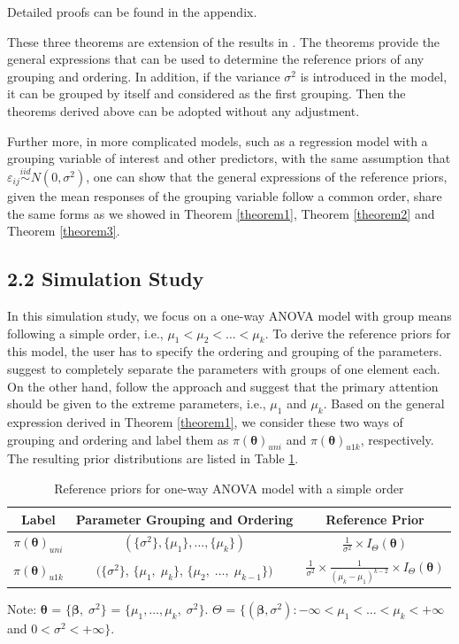 \documentclass[Proceedings]{ascelike}
\begin{document}
Detailed proofs can be found in the appendix. 

These three theorems are extension of the results in
\cite{Sonksen2012}. The theorems provide the general expressions that
can be used to determine the reference priors of any grouping and
ordering. In addition, if the variance $\sigma^2$ is introduced in the
model, it can be grouped by itself and considered as the first
grouping. Then the theorems derived above can be adopted without any
adjustment.


Further more, in more complicated models, such as a regression model
with a grouping variable of interest and other predictors, with the
same assumption that
$\varepsilon_{ij}\overset{iid}{\sim}N(0,\sigma^2)$, one can show that
the general expressions of the reference priors, given the mean
responses of the grouping variable follow a common order, share the
same forms as we showed in Theorem \eqref{theorem1}, Theorem
\eqref{theorem2} and Theorem \eqref{theorem3}.
\subsection{2.2 Simulation Study}
In this simulation study, we focus on a one-way ANOVA model with group
means following a simple order, i.e., $\mu_1<\mu_2<\hdots<\mu_k$. To
derive the reference priors for this model, the user has to specify
the ordering and grouping of the parameters. \cite{BergerBernardo1992}
suggest to completely separate the parameters with groups of one
element each. On the other hand, \cite{Sonksen2012} follow the
\cite{NichollsJones} approach and suggest that the primary attention
should be given to the extreme parameters, i.e., $\mu_1$ and
$\mu_k$. Based on the general expression derived in Theorem
\ref{theorem1}, we consider these two ways of grouping and ordering
and label them as $\pi(\pmb\theta)_{uni}$ and $\pi(\pmb\theta)_{u1k}$,
respectively. The resulting prior distributions are listed in Table
\ref{tab:ref}.
\begin{table}[h!]
\centering
\begin{threeparttable}
\caption{Reference priors for one-way ANOVA model with a simple order}
\begin{tabular}{c|c|c}
\multirow{1}{*}{Label}&Parameter Grouping and Ordering&Reference
Prior\\ \hline
\multirow{1}{*}{$\pi(\pmb\theta)_{uni}$}&$(\{\sigma^2\}, \{\mu_1\},
\hdots, \{\mu_k\})$&$\frac{1}{\sigma^2}\times
I_{\Theta}(\boldsymbol{\theta})$\\ \multirow{1}{*}{$\pi(\pmb\theta)_{u1k}$}&$(\{\sigma^2\}$,
$\{\mu_1,\;\mu_k\}$, $\{\mu_2,\; \hdots,\;
\mu_{k-1}\})$&$\frac{1}{\sigma^2}\times\frac{1}{{(\mu_k-\mu_1)}^{k-2}}\times
I_{\Theta}(\boldsymbol{\theta})$
\end{tabular}
\begin{tablenotes}
\item Note: $\pmb\theta$ = $\{\pmb\beta,\;\sigma^2\}$ = $\{\mu_1,\hdots,\mu_k,\;\sigma^2\}$. $\Theta$ = $\{(\pmb\beta,\sigma^2) : -\infty<\mu_1<\hdots<\mu_k< +\infty $ and $0<\sigma^2< +\infty \}$.
\end{tablenotes}
\label{tab:ref}
\end{threeparttable}
\end{table}
\end{document}
